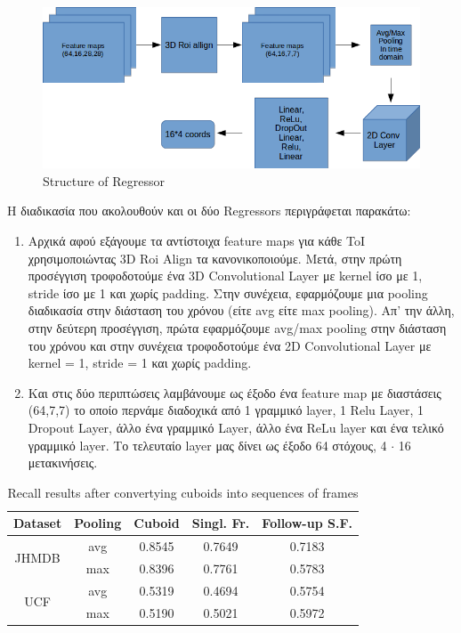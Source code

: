 \documentclass{report}
\begin{document}
\begin{figure}[h]

  \centering
  \includegraphics[scale=0.48]{regressor_1_2}
  \caption{Structure of Regressor}
  \label{fig:reg_1_2}
\end{figure}

Η διαδικασία που ακολουθούν και οι δύο Regressors περιγράφεται παρακάτω:
\begin{enumerate}
\item Αρχικά αφού εξάγουμε τα αντίστοιχα feature maps για κάθε ToI χρησιμοποιώντας 3D Roi Align τα κανονικοποιούμε. Μετά, στην πρώτη προσέγγιση τροφοδοτούμε ένα 3D Convolutional Layer με
  kernel ίσο με 1, stride ίσο με 1 και χωρίς padding. Στην συνέχεια, εφαρμόζουμε μια pooling διαδικασία στην διάσταση του χρόνου (είτε avg είτε max pooling). Απ'
  την άλλη, στην δεύτερη προσέγγιση, πρώτα εφαρμόζουμε avg/max pooling στην διάσταση του χρόνου και στην συνέχεια τροφοδοτούμε ένα 2D Convolutional Layer με
  kernel = 1, stride = 1 και χωρίς padding.
\item Και στις δύο περιπτώσεις λαμβάνουμε ως έξοδο ένα feature map με διαστάσεις (64,7,7) το οποίο περνάμε διαδοχικά από 1 γραμμικό layer, 1 Relu Layer, 1 Dropout Layer,
  άλλο ένα γραμμικό Layer, άλλο ένα ReLu layer και ένα τελικό γραμμικό layer. Το τελευταίο layer μας δίνει ως έξοδο 64 στόχους, 4 $\cdot$ 16 μετακινήσεις.
\end{enumerate}


\begin{table}[h]
  \centering
  \begin{tabular} {||c | c || c | c | c ||}
    \hline
    \textbf{Dataset} & \textbf{Pooling} & \textbf{Cuboid} & \textbf{Singl. Fr. } &  \textbf{Follow-up S.F.}\\
    \hline                
    \multirow{2}{*}{JHMDB} & avg & 0.8545 & 0.7649 & 0.7183 \\
    \cline{2-5}
    {} & max & 0.8396 & 0.7761 & 0.5783 \\
    \cline{1-5}
    \multirow{2}{*}{UCF} & avg & 0.5319 & 0.4694 & 0.5754 \\
    \cline{2-5}
    {} & max & 0.5190 & 0.5021 & 0.5972 \\
    \cline{1-5}
                                   
  \end{tabular}
  \caption{Recall results after convertying cuboids into sequences of frames}
  \label{table:reg_1_1}
\end{table}
\end{document}

